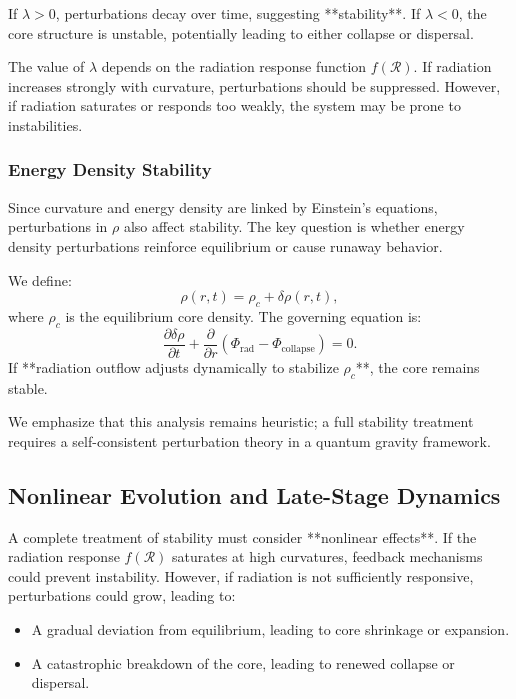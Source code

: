 If \( \lambda > 0 \), perturbations decay over time, suggesting **stability**. If \( \lambda < 0 \), the core structure is unstable, potentially leading to either collapse or dispersal.

The value of \( \lambda \) depends on the radiation response function \( f(\mathcal{R}) \). If radiation increases strongly with curvature, perturbations should be suppressed. However, if radiation saturates or responds too weakly, the system may be prone to instabilities.

\subsubsection{Energy Density Stability}
Since curvature and energy density are linked by Einstein’s equations, perturbations in \( \rho \) also affect stability. The key question is whether energy density perturbations reinforce equilibrium or cause runaway behavior.

We define:
\begin{equation}
    \rho(r,t) = \rho_c + \delta \rho(r,t),
\end{equation}
where \( \rho_c \) is the equilibrium core density. The governing equation is:
\begin{equation}
    \frac{\partial \delta \rho}{\partial t} + \frac{\partial}{\partial r} \left( \Phi_\text{rad} - \Phi_\text{collapse} \right) = 0.
\end{equation}
If **radiation outflow adjusts dynamically to stabilize \( \rho_c \)**, the core remains stable.

We emphasize that this analysis remains heuristic; a full stability treatment requires a self-consistent perturbation theory in a quantum gravity framework.

\subsection{Nonlinear Evolution and Late-Stage Dynamics}
A complete treatment of stability must consider **nonlinear effects**. If the radiation response \( f(\mathcal{R}) \) saturates at high curvatures, feedback mechanisms could prevent instability. However, if radiation is not sufficiently responsive, perturbations could grow, leading to:
\begin{itemize}
    \item A gradual deviation from equilibrium, leading to core shrinkage or expansion.
    \item A catastrophic breakdown of the core, leading to renewed collapse or dispersal.
\end{itemize}

